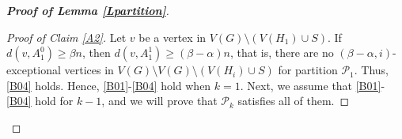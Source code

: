 \documentclass[11pt, a4paper]{article}
\theoremstyle{definition}
\newcommand{\<}{\subseteq}
\begin{document}
\begin{proof}[\bf Proof of Lemma \ref{Lpartition}]
\begin{proof}[Proof of Claim \ref{A2}]
Let $v$ be a vertex in $V(G)\setminus (V(H_1)\cup S)$. If $d(v,A_1^0)\ge \beta n$, then $d(v,A_1^1)\ge (\beta-\alpha)n$, that is, there are no $(\beta-\alpha, i)$-exceptional vertices in $V(G)\setminus V(G)\setminus (V(H_i)\cup S)$ for partition $\mathcal{P}_1$. Thus, \ref{B04} holds.
Hence, \ref{B01}-\ref{B04} hold when $k=1$. Next, we assume that \ref{B01}-\ref{B04} hold for $ k-1$, and we will prove that $\mathcal{P}_k$ satisfies all of them. 







\end{proof}
\end{proof}
\end{document}

